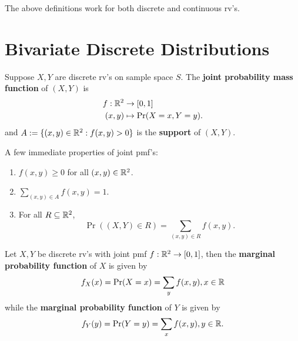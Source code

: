 \documentclass[11pt,fleqn]{book} %
\begin{document}
\begin{remark} The above definitions work for both discrete and continuous rv's.
\end{remark}


\section{Bivariate Discrete Distributions}

\begin{definition} 
Suppose \(X, Y\) are discrete rv's on sample space \(S\). The \textbf{joint probability mass function} of \((X, Y)\) is
\[
\begin{aligned}
f: \mathbb{R}^2 &\rightarrow [0, 1] \\
(x, y) &\mapsto \Pr(X = x, Y = y).
\end{aligned}
\]
and \(A := \{(x, y) \in \mathbb{R}^2: f(x, y) > 0\}\) is the \textbf{support} of \((X, Y)\).
\end{definition}

\begin{remark} A few immediate properties of joint pmf's:
\begin{enumerate} 
\item \(f(x, y) \geq 0\) for all \((x, y) \in \mathbb{R}^2\).
\item \(\sum_{(x, y) \in A} f(x, y) = 1\).
\item For all \(R \subseteq \mathbb{R}^2\),
\[
\Pr((X, Y) \in R) = \sum_{(x, y) \in R} f(x, y).
\]
\end{enumerate}
\end{remark}

\begin{definition}
Let \(X, Y\) be discrete rv's with joint pmf \(f:\mathbb{R}^2 \rightarrow[0, 1]\), then the \textbf{marginal probability function} of \(X\) is given by
\[
f_X(x) = \Pr(X = x) = \sum_{y}f(x, y), x \in \mathbb{R}
\]
while the \textbf{marginal probability function} of \(Y\) is given by
\[
f_Y(y) = \Pr(Y = y) = \sum_{x}f(x, y), y \in \mathbb{R}.
\]
\end{definition}
\end{document}
